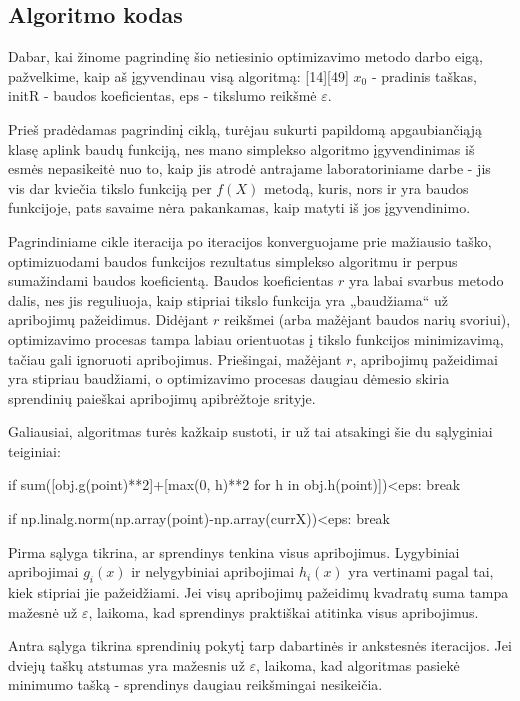\documentclass{article}
\begin{document}
\subsection{Algoritmo kodas}
Dabar, kai žinome pagrindinę šio netiesinio optimizavimo metodo darbo eigą, pažvelkime, kaip aš įgyvendinau visą algoritmą:
[14][49]
$x_{0}$ - pradinis taškas, initR - baudos koeficientas, eps - tikslumo reikšmė $\varepsilon$. 

Prieš pradėdamas pagrindinį ciklą, turėjau sukurti papildomą apgaubiančiąją klasę aplink baudų funkciją, nes mano simplekso algoritmo įgyvendinimas iš esmės nepasikeitė nuo to, kaip jis atrodė antrajame laboratoriniame darbe - jis vis dar kviečia tikslo funkciją per $f(X)$ metodą, kuris, nors ir yra baudos funkcijoje, pats savaime nėra pakankamas, kaip matyti iš jos įgyvendinimo.

Pagrindiniame cikle iteracija po iteracijos konverguojame prie mažiausio taško, optimizuodami baudos funkcijos rezultatus simplekso algoritmu ir perpus sumažindami baudos koeficientą. Baudos koeficientas $r$ yra labai svarbus metodo dalis, nes jis reguliuoja, kaip stipriai tikslo funkcija yra „baudžiama“ už apribojimų pažeidimus. Didėjant $r$ reikšmei (arba mažėjant baudos narių svoriui), optimizavimo procesas tampa labiau orientuotas į tikslo funkcijos minimizavimą, tačiau gali ignoruoti apribojimus. Priešingai, mažėjant $r$, apribojimų pažeidimai yra stipriau baudžiami, o optimizavimo procesas daugiau dėmesio skiria sprendinių paieškai apribojimų apibrėžtoje srityje. 

Galiausiai, algoritmas turės kažkaip sustoti, ir už tai atsakingi šie du sąlyginiai teiginiai:
\begin{python}
    if sum([obj.g(point)**2]+[max(0, h)**2 for h in obj.h(point)])<eps:
        break

    if np.linalg.norm(np.array(point)-np.array(currX))<eps:
        break
\end{python}
Pirma sąlyga tikrina, ar sprendinys tenkina visus apribojimus. Lygybiniai apribojimai $g_{i}(x)$ ir nelygybiniai apribojimai $h_{i}(x)$ yra vertinami pagal tai, kiek stipriai jie pažeidžiami. Jei visų apribojimų pažeidimų kvadratų suma tampa mažesnė už $\varepsilon$, laikoma, kad sprendinys praktiškai atitinka visus apribojimus. 

Antra sąlyga tikrina sprendinių pokytį tarp dabartinės ir ankstesnės iteracijos. Jei dviejų taškų atstumas yra mažesnis už $\varepsilon$, laikoma, kad algoritmas pasiekė minimumo tašką - sprendinys daugiau reikšmingai nesikeičia.
\end{document}
